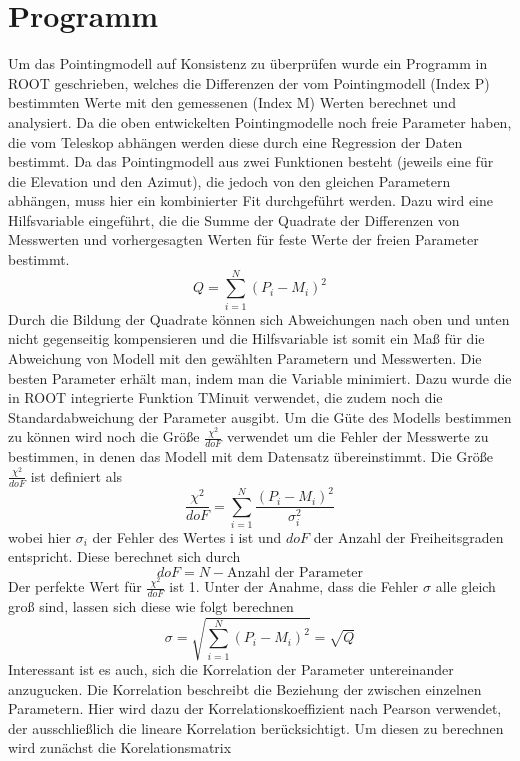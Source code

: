 \section{Programm}
Um das Pointingmodell auf Konsistenz zu überprüfen wurde ein Programm in ROOT geschrieben, welches die Differenzen der vom Pointingmodell (Index P) bestimmten Werte mit den gemessenen (Index M) Werten berechnet und analysiert. Da die oben entwickelten Pointingmodelle noch freie Parameter haben, die vom Teleskop abhängen werden diese durch eine Regression der Daten bestimmt. Da das Pointingmodell aus zwei Funktionen besteht (jeweils eine für die Elevation und den Azimut), die jedoch von den gleichen Parametern abhängen, muss hier ein kombinierter Fit durchgeführt werden. Dazu wird eine Hilfsvariable eingeführt, die die Summe der Quadrate der Differenzen von Messwerten und vorhergesagten Werten für feste Werte der freien Parameter bestimmt.
\begin{equation}
Q=\sum^N_{i=1}\left(P_i-M_i\right)^2
\end{equation}
Durch die Bildung der Quadrate können sich Abweichungen nach oben und unten nicht gegenseitig kompensieren und die Hilfsvariable ist somit ein Maß für die Abweichung von Modell mit den gewählten Parametern und Messwerten. Die besten Parameter erhält man, indem man die Variable minimiert. Dazu wurde die in ROOT integrierte Funktion TMinuit verwendet, die zudem noch die Standardabweichung der Parameter ausgibt. Um die Güte des Modells bestimmen zu können wird noch die Größe $\frac{\chi^2}{doF}$ verwendet um die Fehler der Messwerte zu bestimmen, in denen das Modell mit dem Datensatz übereinstimmt. Die Größe $\frac{\chi^2}{doF}$ ist definiert als
\begin{equation}
\frac{\chi^2}{doF}=\sum^N_{i=1}\frac{\left(P_i-M_i\right)^2}{\sigma_i^2}
\end{equation}
wobei hier $\sigma_i$ der Fehler des Wertes i ist und $doF$ der Anzahl der Freiheitsgraden entspricht. Diese berechnet sich durch
\begin{equation}
doF=N-\textrm{Anzahl der Parameter}
\end{equation}
Der perfekte Wert für $\frac{\chi^2}{doF}$ ist 1. Unter der Anahme, dass die Fehler $\sigma$ alle gleich groß sind, lassen sich diese wie folgt berechnen
\begin{equation}
\sigma=\sqrt{\sum^N_{i=1}\left(P_i-M_i\right)^2}=\sqrt{Q}
\end{equation}
Interessant ist es auch, sich die Korrelation der Parameter untereinander anzugucken. Die Korrelation beschreibt die Beziehung der zwischen einzelnen Parametern. Hier wird dazu der Korrelationskoeffizient nach Pearson verwendet, der ausschließlich die lineare Korrelation berücksichtigt. Um diesen zu berechnen wird zunächst die Korelationsmatrix
